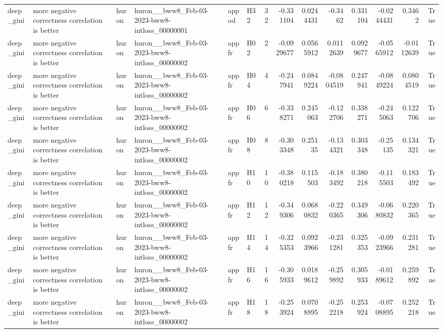 \begin{longtable}{llllllrrrrrrrr}
deep\_gini & more negative correctness correlation is better & huron & huron\_\_bww8\_Feb-03-2023-bww8-intloss\_00000001 & appod & H32 & 32 & -0.331104 & 0.0244431 & -0.3462 & 0.331104 & -0.0244431 & 0.3462 & True \\
deep\_gini & more negative correctness correlation is better & huron & huron\_\_bww8\_Feb-03-2023-bww8-intloss\_00000002 & appfr & H02 & 2 & -0.0929677 & 0.0565912 & 0.0112639 & 0.0929677 & -0.0565912 & -0.0112639 & True \\
deep\_gini & more negative correctness correlation is better & huron & huron\_\_bww8\_Feb-03-2023-bww8-intloss\_00000002 & appfr & H04 & 4 & -0.247941 & 0.0849224 & -0.0804519 & 0.247941 & -0.0849224 & 0.0804519 & True \\
deep\_gini & more negative correctness correlation is better & huron & huron\_\_bww8\_Feb-03-2023-bww8-intloss\_00000002 & appfr & H06 & 6 & -0.338271 & 0.245063 & -0.122706 & 0.338271 & -0.245063 & 0.122706 & True \\
deep\_gini & more negative correctness correlation is better & huron & huron\_\_bww8\_Feb-03-2023-bww8-intloss\_00000002 & appfr & H08 & 8 & -0.303348 & 0.25135 & -0.134321 & 0.303348 & -0.25135 & 0.134321 & True \\
deep\_gini & more negative correctness correlation is better & huron & huron\_\_bww8\_Feb-03-2023-bww8-intloss\_00000002 & appfr & H10 & 10 & -0.380218 & 0.115503 & -0.183492 & 0.380218 & -0.115503 & 0.183492 & True \\
deep\_gini & more negative correctness correlation is better & huron & huron\_\_bww8\_Feb-03-2023-bww8-intloss\_00000002 & appfr & H12 & 12 & -0.349306 & 0.0680832 & -0.220365 & 0.349306 & -0.0680832 & 0.220365 & True \\
deep\_gini & more negative correctness correlation is better & huron & huron\_\_bww8\_Feb-03-2023-bww8-intloss\_00000002 & appfr & H14 & 14 & -0.325353 & 0.0923966 & -0.231281 & 0.325353 & -0.0923966 & 0.231281 & True \\
deep\_gini & more negative correctness correlation is better & huron & huron\_\_bww8\_Feb-03-2023-bww8-intloss\_00000002 & appfr & H16 & 16 & -0.305933 & 0.0189612 & -0.259892 & 0.305933 & -0.0189612 & 0.259892 & True \\
deep\_gini & more negative correctness correlation is better & huron & huron\_\_bww8\_Feb-03-2023-bww8-intloss\_00000002 & appfr & H18 & 18 & -0.253924 & 0.0708895 & -0.252218 & 0.253924 & -0.0708895 & 0.252218 & True \\

\end{longtable}
